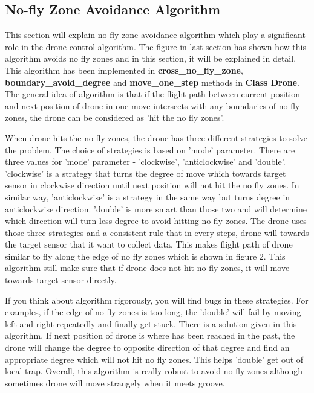 \documentclass[12pt]{article}
\begin{document}
\subsection {No-fly Zone Avoidance Algorithm}
This section will explain no-fly zone avoidance algorithm which play a significant role in the drone control algorithm. The figure in last section has shown how this algorithm avoids no fly zones and in this section, it will be explained in detail. This algorithm has been implemented in \textbf{cross\_no\_fly\_zone}, \textbf{boundary\_avoid\_degree} and \textbf{move\_one\_step} methods in \textbf{Class Drone}. The general idea of algorithm is that if the flight path between current position and next position of drone in one move intersects with any boundaries of no fly zones, the drone can be considered as 'hit the no fly zones'. 

When drone hits the no fly zones, the drone has three different strategies to solve the problem. The choice of strategies is based on 'mode' parameter. There are three values for 'mode' parameter - 'clockwise', 'anticlockwise' and 'double'. 'clockwise' is a strategy that turns the degree of move which towards target sensor in clockwise direction until next position will not hit the no fly zones. In similar way, 'anticlockwise' is a strategy in the same way but turns degree in anticlockwise direction. 'double' is more smart than those two and will determine which direction will turn less degree to avoid hitting no fly zones. The drone uses those three strategies and a consistent rule that in every steps, drone will towards the target sensor that it want to collect data. This makes flight path of drone similar to fly along the edge of no fly zones which is shown in figure 2. This algorithm still make sure that if drone does not hit no fly zones, it will move towards target sensor directly. 

If you think about algorithm rigorously, you will find bugs in these strategies. For examples, if the edge of no fly zones is too long, the 'double' will fail by moving left and right repeatedly and finally get stuck. There is a solution given in this algorithm. If next position of drone is where has been reached in the past, the drone will change the degree to opposite direction of that degree and find an appropriate degree which will not hit no fly zones. This helps 'double' get out of local trap. Overall, this algorithm is really robust to avoid no fly zones although sometimes drone will move strangely when it meets groove. 
\end{document}
